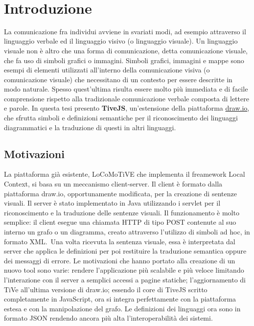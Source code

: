﻿﻿\chapter{Introduzione}

    La comunicazione fra individui avviene in svariati modi, ad esempio attraverso il linguaggio verbale ed il linguaggio visivo (o linguaggio visuale).
    \newline
    Un linguaggio visuale non è altro che una forma di comunicazione, detta comunicazione visuale, che fa uso di simboli grafici o immagini. Simboli grafici, immagini e mappe sono esempi di elementi utilizzati all'interno della comunicazione visiva (o comunicazione visuale) che necessitano di un contesto per essere descritte in modo naturale. Spesso quest'ultima risulta essere molto più immediata e di facile comprensione rispetto alla tradizionale comunicazione verbale composta di lettere e parole.
    \newline
    In questa tesi presento \textbf{TiveJS}, un'estensione della piattaforma \href{https://www.draw.io/}{draw.io}, che sfrutta  simboli e  definizioni semantiche per il riconoscimento dei linguaggi diagrammatici e la traduzione di questi in altri linguaggi.

    \section{Motivazioni}
        La piattaforma già esistente, LoCoMoTiVE che implementa il freamework Local Context, si basa su un meccanismo client-server.
        \newline
        Il client è formato dalla piattaforma draw.io, opportunamente modificata, per la creazione di sentenze visuali.
        Il server è stato implementato in Java utilizzando i servlet per il riconoscimento e la traduzione delle sentenze visuali.
        Il funzionamento è molto semplice: il client esegue una chiamata HTTP di tipo POST contenute al suo interno un grafo o un diagramma, creato attraverso l'utilizzo di simboli ad hoc, in formato XML.~Una volta ricevuta la sentenza visuale, essa è interpretata dal server che applica le definizioni per poi restituire la traduzione semantica oppure dei messaggi di errore.
        \newline
        Le motivazioni che hanno portato alla creazione di un nuovo tool sono varie: rendere l'applicazione più scalabile e più veloce limitando l'interazione con il server a semplici accessi a pagine statiche; l'aggiornamento di TiVe all'ultima versione di draw.io; essendo il core di TiveJS scritto completamente in JavaScript, ora si integra perfettamente con la piattaforma estesa e con la manipolazione del grafo.
        Le definizioni dei linguaggi ora sono in formato JSON rendendo ancora più alta l'interoperabilità dei sistemi. 


